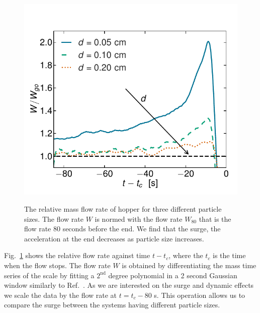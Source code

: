 \documentclass[twoside,twocolumn,9pt]{article}
\begin{document}
\begin{figure}[!t]
\includegraphics[width=\columnwidth]{fig3-surge.pdf}\\
 
\caption{The relative mass flow rate of hopper for three different particle sizes. The flow rate $W$ is normed with the flow rate $W_{80}$ that is the flow rate 80 seconds before the end. We find that the surge, the acceleration at the end decreases as particle size increases.
\label{fig:surge}}
\end{figure}
%
Fig.~\ref{fig:surge} shows the relative flow rate against time 
$t-t_{c}$, where the $t_{c}$ is the time when the flow stops. 
The flow rate $W$ is obtained by differentiating the mass time series of the 
scale by fitting a $2^{\mathrm{nd}}$ degree polynomial in a 2 second 
Gaussian window similarly to Ref.~\cite{koivistoSubmitted}.
As we are interested on the surge and dynamic effects we scale the data by the flow rate at $t=t_c-80$ s.
This operation allows us to compare the surge between the systems having different particle sizes.
\end{document}
